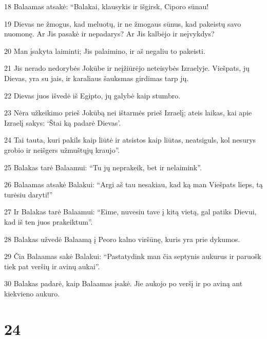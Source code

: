 \par 18 Balaamas atsakė: “Balakai, klausykis ir išgirsk, Ciporo sūnau! 
\par 19 Dievas ne žmogus, kad meluotų, ir ne žmogaus sūnus, kad pakeistų savo nuomonę. Ar Jis pasakė ir nepadarys? Ar Jis kalbėjo ir neįvykdys? 
\par 20 Man įsakyta laiminti; Jis palaimino, ir aš negaliu to pakeisti. 
\par 21 Jis nerado nedorybės Jokūbe ir neįžiūrėjo neteisybės Izraelyje. Viešpats, jų Dievas, yra su jais, ir karaliaus šauksmas girdimas tarp jų. 
\par 22 Dievas juos išvedė iš Egipto, jų galybė kaip stumbro. 
\par 23 Nėra užkeikimo prieš Jokūbą nei ištarmės prieš Izraelį; ateis laikas, kai apie Izraelį sakys: ‘Štai ką padarė Dievas’. 
\par 24 Tai tauta, kuri pakils kaip liūtė ir atsistos kaip liūtas, neatsiguls, kol nesurys grobio ir neišgers užmuštųjų kraujo”. 
\par 25 Balakas tarė Balaamui: “Tu jų neprakeik, bet ir nelaimink”. 
\par 26 Balaamas atsakė Balakui: “Argi aš tau nesakiau, kad ką man Viešpats lieps, tą turėsiu daryti!” 
\par 27 Ir Balakas tarė Balaamui: “Eime, nuvesiu tave į kitą vietą, gal patiks Dievui, kad iš ten juos prakeiktum”. 
\par 28 Balakas užvedė Balaamą į Peoro kalno viršūnę, kuris yra prie dykumos. 
\par 29 Čia Balaamas sakė Balakui: “Pastatydink man čia septynis aukurus ir paruošk tiek pat veršių ir avinų aukai”. 
\par 30 Balakas padarė, kaip Balaamas įsakė. Jie aukojo po veršį ir po aviną ant kiekvieno aukuro.



\chapter{24}


